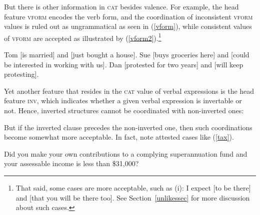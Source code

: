 \eal
{}\label{vpbad1}
\label{vpbad2}
\zl

But there is other information in \textsc{cat} besides valence. For example, the head feature
\textsc{vform} encodes the verb form, and the coordination of inconsistent \textsc{vform} values is
ruled out as ungrammatical as seen in (\ref{vform}), while consistent values of \textsc{vform} are
accepted as illustrated by (\ref{vform2}).\footnote{%
That said, some cases are more acceptable, such as (i):
\ea
I expect [to be there] and [that you will be there too].
\z
See Section~\ref{unlikessec} for more discussion about such cases.}


\eal
\label{vform}
\zl



\eal
\label{vform2}
\ex Tom [is married] and [just bought  a house].
\ex Sue [buys groceries here] and [could be interested in working with us].
\ex Dan [protested for two years] and [will keep protesting].
\zl

Yet another feature that resides in the \textsc{cat} value of verbal expressions is the head feature \textsc{inv}, which indicates whether a given verbal expression is invertable or not. Hence, inverted structures cannot be coordinated with non-inverted ones:


\eal
{}
\zl

\eal
{}
\zl

\noindent
But if the inverted clause precedes the non-inverted one, then such coordinations become somewhat more acceptable. In fact,  \citet[1332--1333]{rodney} note attested cases like 
(\ref{tax}).

\ea
Did you make your own contributions to a complying superannuation fund and
your assessable income is less than \$31,000?\label{tax}
\z

